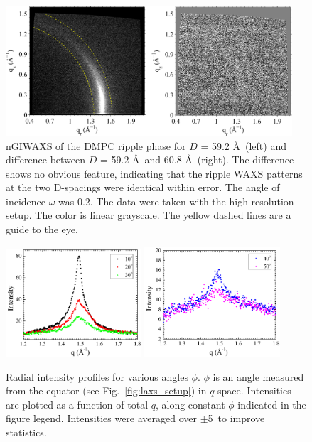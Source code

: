 \begin{figure}[htbp]
  \centering
  \includegraphics[width=0.95\textwidth]{figures/ripple/nGIWAXS/dmpc1_046}
  \caption[nGIWAXS of the DMPC ripple phase for $D$ = 59.2 \AA\ (left)
  and difference between $D$ = 59.2 \AA\ and 60.8 \AA\ (right)]
  {nGIWAXS of the DMPC ripple phase for $D$ = 59.2 \AA\ (left)
  and difference between $D$ = 59.2 \AA\ and 60.8 \AA\ (right). 
  The difference shows no obvious feature, indicating that the ripple WAXS
  patterns at the two D-spacings were identical within error.
  The angle of incidence $\omega$ was 0.2\textdegree. The data were taken
  with the high resolution setup. The color is linear grayscale.
  The yellow dashed lines are a guide to the eye.}
  \label{fig:nGIWAXS}
\end{figure}

\begin{figure}[htbp]
  \centering
  \includegraphics[width=0.45\textwidth]{figures/ripple/nGIWAXS/sector_1-3}
  \includegraphics[width=0.45\textwidth]{figures/ripple/nGIWAXS/sector_4-5}
  \caption[Radial intensity profiles for various angles $\phi$]
  {Radial intensity profiles for various angles $\phi$.
  $\phi$ is an angle measured from the equator (see Fig.~\ref{fig:laxs_setup})
  in $q$-space.  
  Intensities are plotted as a function 
  of total $q$, along constant $\phi$ indicated in the figure legend. 
  Intensities were averaged over $\pm$5\textdegree\ to improve statistics.}
  \label{fig:sector_plots}
\end{figure}

